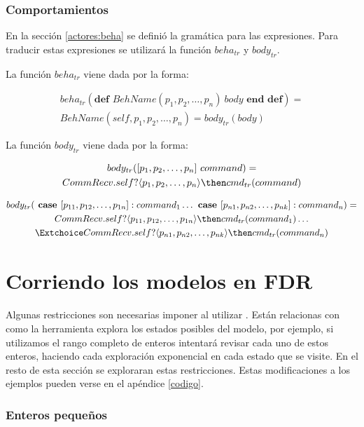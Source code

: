 \subsubsection*{Comportamientos}
En la sección \ref{actores:beha} se definió la gramática para las expresiones. Para traducir estas expresiones se utilizará la función $beha_{tr}$ y $body_{tr}$.

La función $beha_{tr}$ viene dada por la forma:

\begin{multline*}
beha_{tr}(\textbf{def } BehName(p_1, p_2,\ldots, p_n)\ body \textbf{ end def}) = \\
BehName(self, p_1, p_2,\ldots, p_n) = body_{tr}(body) 
\end{multline*}

La función $body_{tr}$ viene dada por la forma:

\begin{multline*}
body_{tr}([ p_1, p_2,\ldots, p_n]\ command) = \\
 CommRecv.self?\langle p_1, p_2,\ldots, p_n \rangle \then cmd_{tr}(command)
\end{multline*}

\begin{multline*}
body_{tr}(\textbf{ case } [p_{11}, p_{12},\ldots, p_{1n}]: command_1 \ldots \textbf{ case } [p_{n1}, p_{n2},\ldots, p_{nk}]: command_n ) = \\
CommRecv.self?\langle p_{11}, p_{12},\ldots, p_{1n} \rangle \then cmd_{tr}(command_1) \ldots \\
\Extchoice CommRecv.self?\langle p_{n1}, p_{n2},\ldots, p_{nk} \rangle \then cmd_{tr}(command_n) 
\end{multline*}

\section{Corriendo los modelos en FDR}

Algunas restricciones son necesarias imponer al utilizar \FDR. Están relacionas con como la herramienta explora los estados posibles del modelo, por ejemplo, si utilizamos el rango completo de enteros intentará revisar cada uno de estos enteros, haciendo cada exploración exponencial en cada estado que se visite. En el resto de esta sección se exploraran estas restricciones. Estas modificaciones a los ejemplos pueden verse en el apéndice \ref{codigo}.

\subsubsection*{Enteros pequeños}

